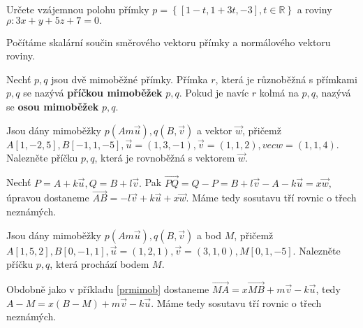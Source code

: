 \begin{priklad}
Určete vzájemnou polohu přímky $p=\left \{ [1-t,1+3t,-3],t \in \mathbb R \right \} $ a
roviny $\rho:3x+y+5z+7=0.$
\end{priklad}

\begin{reseni}
Počítáme skalární součin směrového vektoru přímky a normálového vektoru roviny.
\end{reseni}

\begin{definition}
Nechť $p,q$ jsou dvě mimoběžné přímky. Přímka $r$, která je různoběžná s přímkami
$p,q$ se nazývá \textbf{příčkou mimoběžek} $p,q$. Pokud je navíc $r$ kolmá na $p,q$,
nazývá se \textbf{osou mimoběžek} $p,q$.
\end{definition}

\begin{priklad}\label{prmimob}
Jsou dány mimoběžky  $p(Am\vec u), q(B,\vec v)$ a vektor $\vec w$, přičemž
$A[1,-2,5],B[-1,1,-5], \vec u = (1,3,-1), \vec v=(1,1,2), vec w = (1,1,4).$
Nalezněte příčku $p,q$, která je rovnoběžná s vektorem $\vec w.$
\end{priklad}

\begin{reseni}
Nechť $P=A+k\vec u, Q=B+l\vec v.$ Pak $\overrightarrow{PQ}=Q-P=B+l\vec v - A - k\vec u=x\vec w,$
úpravou dostaneme $\overrightarrow{AB}=-l\vec v+k\vec u+x\vec w.$ Máme tedy
sosutavu tří rovnic o třech neznámých.
\end{reseni}

\begin{priklad}
Jsou dány mimoběžky $p(Am\vec u), q(B,\vec v)$ a bod $M$, přičemž
$A[1,5,2],B[0,-1,1], \vec u=(1,2,1), \vec v = (3,1,0), M[0,1,-5].$  Nalezněte
příčku $p,q$, která prochází bodem $M$.
\end{priklad}

\begin{reseni}
Obdobně jako v příkladu \ref{prmimob} dostaneme $\overrightarrow{MA}=x\overrightarrow{MB}+m\vec v-k\vec u$,
tedy $A-M=x(B-M)+m\vec v - k\vec u$. Máme tedy
sosutavu tří rovnic o třech neznámých.
\end{reseni}
